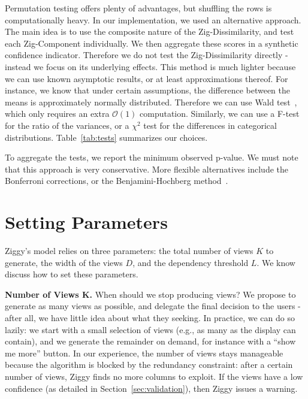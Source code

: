 Permutation testing offers plenty of advantages, but shuffling the rows is
computationally heavy. In our implementation, we used an alternative approach. The
main idea is to use the composite nature of the Zig-Dissimilarity, and test
each Zig-Component individually. We then aggregate these scores in a synthetic
confidence indicator. Therefore we do not test the Zig-Dissimilarity directly -
instead we focus on its underlying effects.  This method is much lighter because we can use
known asymptotic results, or at least approximations thereof. For instance, we
know that under certain assumptions, the difference between the means is
approximately normally distributed. Therefore we can use Wald
test~\cite{wasserman2013all}, which only requires an extra $\mathcal{O}(1)$
computation.  Similarly, we can use a F-test for the ratio of the variances,
or a $\chi^2$ test for the differences in categorical distributions.
Table~\ref{tab:tests} summarizes our choices. 

To aggregate the tests, we report the minimum observed p-value. We must note
that this approach is very conservative. More flexible alternatives include
the Bonferroni corrections, or the Benjamini-Hochberg
method~\cite{wasserman2013all}.

\section{Setting Parameters}
\label{sec:parameters}

Ziggy's model relies on three parameters: the total number of views $K$ to
generate, the width of the views $D$, and the dependency threshold $L$. We know
discuss how to set these parameters.

\textbf{Number of Views K.} When should we stop producing views? We propose to
generate as many views as possible, and delegate the final decision to the
users - after all, we have little idea about what they seeking. In practice, we
can do so lazily: we start with a small selection of views (e.g., as many as
the display can contain), and we generate the remainder on demand, for instance
with a ``show me more'' button.  In our experience, the number of views stays
manageable because the algorithm is blocked by the redundancy constraint: after
a certain number of views, Ziggy finds no more columns to exploit. If the views
have a low confidence (as detailed in Section~\ref{sec:validation}), then Ziggy
issues a warning.

